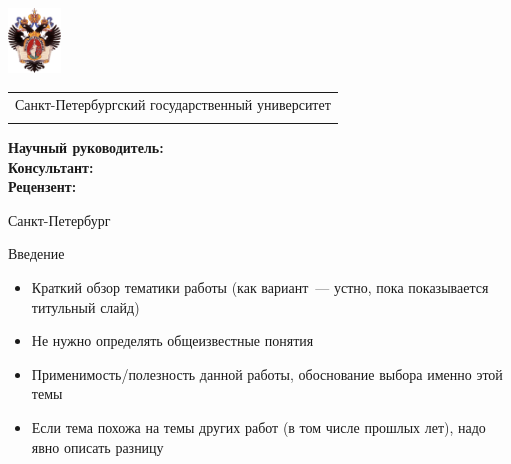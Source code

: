 \documentclass
  [ russian
  , aspectratio=1610 %
  ] {beamer}
\title[Короткое название]{\my@title@title@ru}
\author[\my@title@author@ru]{\my@title@author@ru, группа \academicGroup}
\institute[СПбГУ]{}
\date[9 сентября 2024 г.]{}
\makeatletter
\newcommand{\advisorChair}{\my@title@chair@ru}
\newcommand{\supervisor}{\my@title@supervisor@ru}
\newcommand{\supervisorPosition}{\my@title@supervisorPosition@ru}
\newcommand{\consultant}{\my@title@consultant@ru}
\newcommand{\consultantPosition}{\my@title@consultantPosition@ru}
\newcommand{\reviewer}{\my@title@reviewer@ru}
\newcommand{\reviewerPosition}{\my@title@reviewerPosition@ru}
\newcommand{\defenseYear}{\my@title@year@ru}
\makeatother
\begin{document}
{
\begin{frame}
    \includegraphics[width=1.4cm]{figures/SPbGU_Logo.png}
    \vspace{-35pt}
    \hspace{-10pt}
    \begin{center}
        \begin{tabular}{c}
            \scriptsize{Санкт-Петербургский государственный университет} \\
            \scriptsize{\advisorChair}
        \end{tabular}
        \titlepage
    \end{center}

    \btVFill

    {\scriptsize
        \textbf{Научный руководитель:}  \supervisorPosition~\supervisor \\
        \textbf{Консультант:}  \consultantPosition~\consultant \\
        \textbf{Рецензент:} \reviewerPosition~\reviewer \\
    }
    \makeatother
    \begin{center}
        \vspace{5pt}
        \scriptsize{Санкт-Петербург\\ \defenseYear}
    \end{center}
\end{frame}
}

\begin{frame}{Введение}
    \begin{itemize}
        \item Краткий обзор тематики работы (как вариант~--- устно, пока показывается титульный слайд)
        \item Не нужно определять общеизвестные понятия
        \item Применимость/полезность данной работы, обоснование выбора именно этой темы
        \item Если тема похожа на темы других работ (в том числе прошлых лет), надо явно описать разницу
    \end{itemize}
\end{frame}
\end{document}

